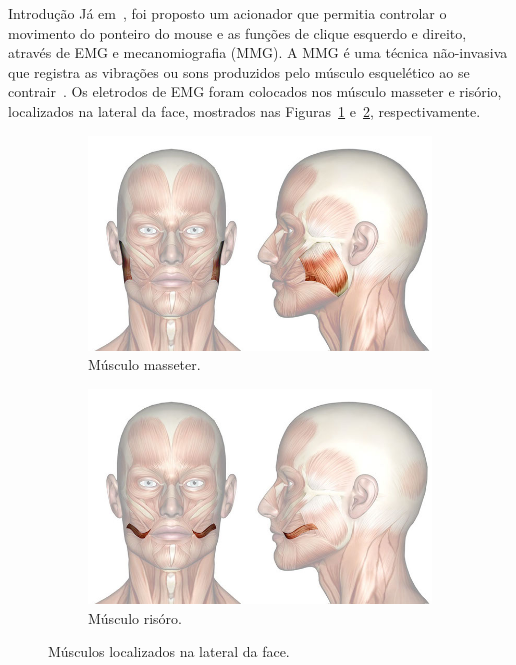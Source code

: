 \begin{chapter}{Introdução}
Já em~\cite{Kaushik12}, foi proposto um acionador que permitia controlar o
movimento do ponteiro do mouse e as funções de clique esquerdo e direito,
através de EMG e mecanomiografia (MMG). A MMG é uma técnica não-invasiva que
registra as vibrações ou sons produzidos pelo músculo esquelético ao se
contrair~\cite{Vaz99}. Os eletrodos de EMG foram colocados nos músculo masseter
e risório, localizados na lateral da face, mostrados nas
Figuras~\ref{fig:masseter} e~\ref{fig:risorio}, respectivamente. 


\begin{figure}
\centering
\begin{subfigure}{.4\textwidth}
  \centering
  \includegraphics[width=1\linewidth, height=0.2\textheight]{fig/masseter}
  \caption{Músculo masseter.}
  \label{fig:masseter}
\end{subfigure}%
\begin{subfigure}{0.4\textwidth}
  \centering
  \includegraphics[width=1\linewidth, height=0.2\textheight]{fig/risorio}
  \caption{Músculo risóro.}
  \label{fig:risorio}
\end{subfigure}
\caption{Músculos localizados na lateral da face.}
\label{fig:test}
\end{figure}


\end{chapter}
